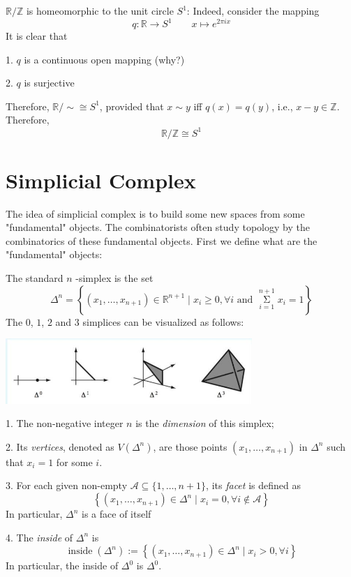 \begin{example} \(\mathbb{R}/\mathbb{Z}\) is homeomorphic to the unit circle \({S}^{1}\): Indeed, consider the mapping
\[
q: \mathbb{R} \rightarrow  {S}^{1}
\quad \quad
x \mapsto  {e}^{2\pi ix}
\]
It is clear that

1. \(q\) is a continuous open mapping (why?)

2. \(q\) is surjective

Therefore, \(\mathbb{R}/ \sim   \cong  {S}^{1}\), provided that \(x \sim  y\) iff \(q\left( x\right)  = q\left( y\right)\), i.e., \(x - y \in  \mathbb{Z}\). Therefore,
\[
\mathbb{R}/\mathbb{Z} \cong  {S}^{1}
\]
\end{example}

\section{Simplicial Complex}
The idea of simplicial complex is to build some new spaces from some "fundamental" objects. The combinatorists often study topology by the combinatorics of these fundamental objects. First we define what are the "fundamental" objects:

\begin{definition}[ \(n\) -simplex] \label{def:n_simplex} The standard \(n\) -simplex is the set
\[
{\Delta }^{n} = \left\{  {\left( {{x}_{1},\ldots,{x}_{n + 1}}\right)  \in  {\mathbb{R}}^{n + 1} \mid  {x}_{i} \geq  0,\forall i\text{ and }\mathop{\Sigma }\limits_{{i = 1}}^{{n + 1}}{x}_{i} = 1}\right\}
\]
The $0$, $1$, $2$ and $3$ simplices can be visualized as follows:
\begin{center}
\includegraphics[width=0.7\textwidth]{images/Ch4_simplices.jpg}
\end{center}

1. The non-negative integer \(n\) is the \emph{dimension} of this simplex;

2. Its \emph{vertices}, denoted as \(V\left( {\Delta }^{n}\right)\), are those points \(\left( {{x}_{1},\ldots,{x}_{n + 1}}\right)\) in \({\Delta }^{n}\) such that \({x}_{i} = 1\) for some \(i\).

3. For each given non-empty \(\mathcal{A} \subseteq  \{ 1,\ldots,n + 1\}\), its \emph{facet} is defined as
\[
\left\{  {\left( {{x}_{1},\ldots,{x}_{n + 1}}\right)  \in  {\Delta }^{n} \mid  {x}_{i} = 0,\forall i \notin  \mathcal{A}}\right\}
\]
In particular, \({\Delta }^{n}\) is a face of itself

4. The \emph{inside} of \({\Delta }^{n}\) is
\[
\operatorname{inside}\left( {\Delta }^{n}\right)  \mathrel{\text{:= }} \left\{  {\left( {{x}_{1},\ldots,{x}_{n + 1}}\right)  \in  {\Delta }^{n} \mid  {x}_{i} > 0,\forall i}\right\}
\]
In particular, the inside of \({\Delta }^{0}\) is \({\Delta }^{0}\).
\end{definition}

